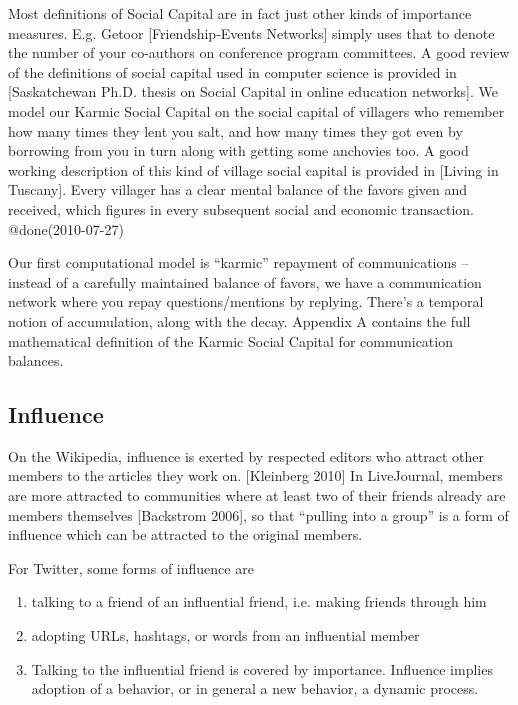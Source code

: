 	Most definitions of Social Capital are in fact just other kinds of importance measures.  E.g. Getoor [Friendship-Events Networks] simply uses that to denote the number of your co-authors on conference program committees.  A good review of the definitions of social capital used in computer science is provided in [Saskatchewan Ph.D. thesis on Social Capital in online education networks].  We model our Karmic Social Capital on the social capital of villagers who remember how many times they lent you salt, and how many times they got even by borrowing from you in turn along with getting some anchovies too.  A good working description of this kind of village social capital is provided in [Living in Tuscany].  Every villager has a clear mental balance of the favors given and received, which figures in every subsequent social and economic transaction.  @done(2010-07-27)
	
	Our first computational model is ``karmic'' repayment of communications -- instead of a carefully maintained balance of favors, we have a communication network where you repay questions/mentions by replying.  There's a temporal notion of accumulation, along with the decay.  Appendix A contains the full mathematical definition of the Karmic Social Capital for communication balances.

\subsection{Influence}
	
	On the Wikipedia, influence is exerted by respected editors who attract other members to the articles they work on. [Kleinberg 2010]  In LiveJournal, members are more attracted to communities where at least two of their friends already are members themselves [Backstrom 2006], so that “pulling into a group” is a form of influence which can be attracted to the original members.
	
	For Twitter, some forms of influence are
	
\begin{enumerate}
\item talking to a friend of an influential friend, i.e. making friends through him
\item adopting URLs, hashtags, or words from an influential member
\item Talking to the influential friend is covered by importance.  Influence implies adoption of a behavior, or in general a new behavior, a dynamic process.
\end{enumerate}

